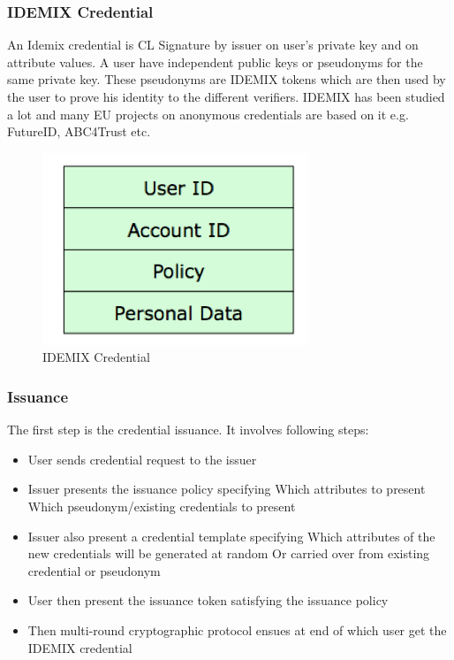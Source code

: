 \subsubsection{IDEMIX Credential}
An Idemix credential is CL Signature by issuer on user's private key and on attribute values. A user have independent public keys or pseudonyms for the same private key. These pseudonyms are IDEMIX tokens which are then used by the user to prove his identity to the different verifiers. IDEMIX has been studied a lot and many EU projects on anonymous credentials are based on it e.g. FutureID, ABC4Trust etc.
\begin{figure}[h]
	\centering
	\includegraphics[width=\textwidth]{figures/Credential}
	\caption{IDEMIX Credential}
	\label{fig:Credential}
\end{figure}
\subsubsection{Issuance}
The first step is the credential issuance. It involves following steps:
\begin{itemize}
	\item User sends credential request to the issuer
	\item Issuer presents the issuance policy specifying
		\subitem Which attributes to present
		\subitem Which pseudonym/existing credentials to present
	\item Issuer also present a credential template specifying
		\subitem Which attributes of the new credentials will be generated at random
		\subitem Or carried over from existing credential or pseudonym
	\item User then present the issuance token satisfying the issuance policy
	\item Then multi-round cryptographic protocol ensues at end of which user get the IDEMIX credential
\end{itemize}
